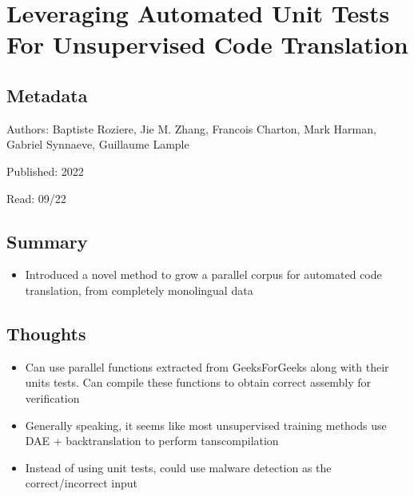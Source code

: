 \documentclass{article}
\begin{document}
\pagebreak


\section*{Leveraging Automated Unit Tests For Unsupervised Code Translation}

\subsection*{Metadata}

\noindent Authors: Baptiste Roziere, Jie M. Zhang, Francois Charton, Mark Harman, Gabriel Synnaeve, Guillaume Lample

\noindent Published: 2022

\noindent Read: 09/22

\subsection*{Summary}
\begin{itemize}
	\item Introduced a novel method to grow a parallel corpus for automated code translation, from completely monolingual data
\end{itemize}

\subsection*{Thoughts}
\begin{itemize}
	\item Can use parallel functions extracted from GeeksForGeeks along with their units tests. Can compile these functions to obtain correct assembly for verification
	\item Generally speaking, it seems like most unsupervised training methods use DAE + backtranslation to perform tanscompilation 
	\item Instead of using unit tests, could use malware detection as the correct/incorrect input
\end{itemize}
\end{document}
